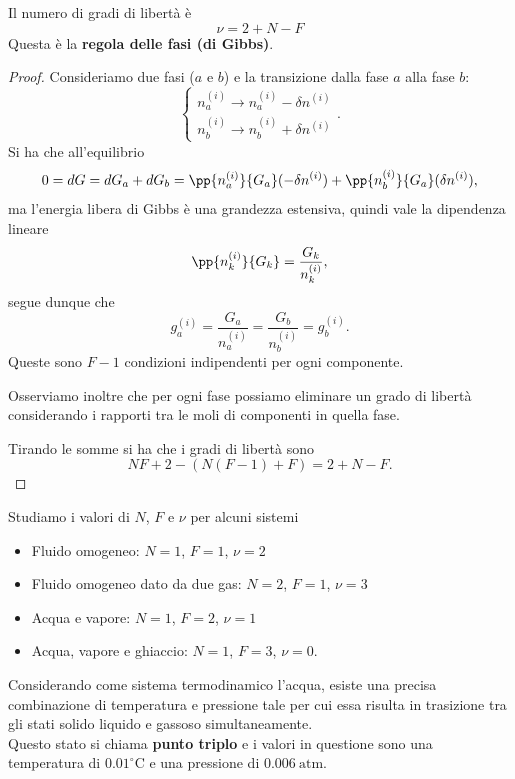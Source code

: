 \begin{proposition}\label{RegolaFasiGibbs}
Il numero di gradi di libert\`a \`e
\[\boxed{\nu=2+N-F}\]
Questa \`e la \textbf{regola delle fasi (di Gibbs)}.
\end{proposition}
\begin{proof}
Consideriamo due fasi ($a$ e $b$) e la transizione dalla fase $a$ alla fase $b$:
\[\begin{cases}
n_a^{(i)}\to n_a^{(i)}-\delta n^{(i)}\\
n_b^{(i)}\to n_b^{(i)}+\delta n^{(i)}
\end{cases}.\]
Si ha che all'equilibrio
\[0=dG=dG_a+dG_b=\pp {n_a^{(i)}}{G_a}(-\delta n^{(i)})+\pp {n_b^{(i)}}{G_a}(\delta n^{(i)}),\]
ma l'energia libera di Gibbs \`e una grandezza estensiva, quindi vale la dipendenza lineare
\[\pp {n_k^{(i)}}{G_k}=\frac{G_k}{n_k^{(i)}},\]
segue dunque che
\[g_a^{(i)}=\frac{G_a}{n_a^{(i)}}=\frac{G_b}{n_b^{(i)}}=g_b^{(i)}.\]
Queste sono $F-1$ condizioni indipendenti per ogni componente.
\bigskip

\noindent Osserviamo inoltre che per ogni fase possiamo eliminare un grado di libert\`a considerando i rapporti tra le moli di componenti in quella fase.\bigskip

\noindent Tirando le somme si ha che i gradi di libert\`a sono
\[NF+2-(N(F-1)+F)=2+N-F.\]
\end{proof}



\begin{example}
Studiamo i valori di $N$, $F$ e $\nu$ per alcuni sistemi
\begin{itemize}
\item Fluido omogeneo: $N=1$, $F=1$, $\nu=2$
\item Fluido omogeneo dato da due gas: $N=2$, $F=1$, $\nu=3$
\item Acqua e vapore: $N=1$, $F=2$, $\nu=1$
\item Acqua, vapore e ghiaccio: $N=1$, $F=3$, $\nu=0$.
\end{itemize}
\end{example}

\begin{definition}
Considerando come sistema termodinamico l'acqua, esiste una precisa combinazione di temperatura e pressione tale per cui essa risulta in trasizione tra gli stati solido liquido e gassoso simultaneamente.\\
Questo stato si chiama \textbf{punto triplo} e i valori in questione sono una temperatura di $0.01 ^\circ \mathrm{C}$ e una pressione di $0.006\ \mathrm{atm}$.
\end{definition}

